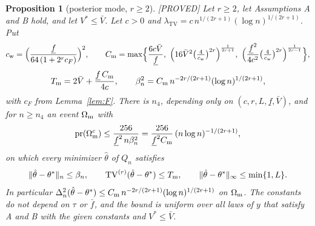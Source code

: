 \documentclass[11pt]{article}
\newtheorem{proposition}{Proposition}
\theoremstyle{definition}
\theoremstyle{remark}
\newcommand{\pr}{\mathrm{pr}}
\newcommand{\TV}{\mathrm{TV}}
\newcommand{\lamtv}{\lambda_{\TV}}
\newcommand{\thetas}{\theta^{*}}
\newcommand{\fl}{\underline f}
\newcommand{\fu}{\bar f}
\newcommand{\Vb}{\bar V}
\newcommand{\nn}[1]{\|#1\|_n}
\newcommand{\proved}{\textup{[PROVED]}}
\begin{document}
\begin{proposition}[posterior mode, $r\ge2$]\label{prop:mode}\proved{}
Let $r\ge2$, let Assumptions A and B hold, and let $V^{*}\le\Vb$. Let $c>0$ and $\lamtv=c\,n^{1/(2r+1)}(\log n)^{1/(2r+1)}$. Put
\[
c_{\rm w}=\Bigl(\frac{\fl}{64\,(1+2^rc_F)}\Bigr)^{2},\qquad
C_{\rm m}=\max\Bigl\{\frac{6c\Vb}{\fl},\ \Bigl(16\Vb^2\bigl(\tfrac4{c_{\rm w}}\bigr)^{2r}\Bigr)^{\frac1{2r+1}},\ \Bigl(\frac{\fl^2}{4c^2}\bigl(\tfrac4{c_{\rm w}}\bigr)^{2r}\Bigr)^{\frac1{2r-1}}\Bigr\},
\]
\[
T_{\rm m}=2\Vb+\frac{\fl\,C_{\rm m}}{4c},\qquad \beta_n^2=C_{\rm m}\,n^{-2r/(2r+1)}(\log n)^{1/(2r+1)} ,
\]
with $c_F$ from Lemma~\ref{lem:F}. There is $n_4$, depending only on $(c,r,L,\fl,\Vb)$, and for $n\ge n_4$ an event $\Omega_{\rm m}$ with
\[
\pr(\Omega_{\rm m}^c)\le\frac{256}{\fl^2\,n\beta_n^2}=\frac{256}{\fl^2C_{\rm m}}\,(n\log n)^{-1/(2r+1)},
\]
on which \emph{every} minimizer $\hat\theta$ of $Q_n$ satisfies
\[
\nn{\hat\theta-\thetas}\le\beta_n,\qquad \TV^{(r)}(\hat\theta-\thetas)\le T_{\rm m},\qquad \|\hat\theta-\thetas\|_\infty\le\min\{1,L\}.
\]
In particular $\Delta_n^2(\hat\theta-\thetas)\le C_{\rm m}\,n^{-2r/(2r+1)}(\log n)^{1/(2r+1)}$ on $\Omega_{\rm m}$. The constants do not depend on $\tau$ or $\fu$, and the bound is uniform over all laws of $y$ that satisfy A and B with the given constants and $V^{*}\le\Vb$.
\end{proposition}
\end{document}
